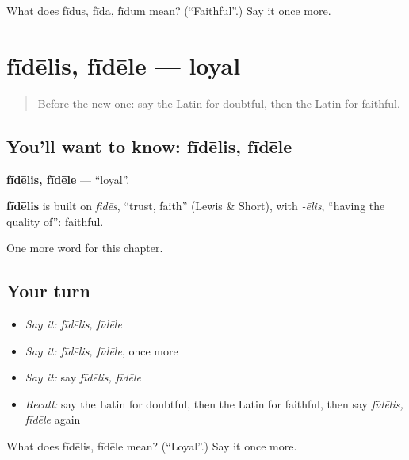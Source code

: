 \begin{tcolorbox}[breakable,colback=teal!4,colframe=teal!35!black,title={Before you move on}]
What does fīdus, fīda, fīdum mean? (\textquotedblleft{}Faithful\textquotedblright{}.) Say it once more.
\end{tcolorbox}
\section[fīdēlis, fīdēle]{fīdēlis, fīdēle — loyal}

\label{lesson:LA-C243-fidelis}



\begin{quote}
Before the new one: say the Latin for doubtful, then the Latin for faithful.
\end{quote}

\subsection*{You'll want to know: fīdēlis, fīdēle}
\textbf{fīdēlis, fīdēle} — \textquotedblleft{}loyal\textquotedblright{}.

\begin{cousinweb}
\textbf{fīdēlis} is built on \emph{fidēs}, \textquotedblleft{}trust, faith\textquotedblright{} (Lewis \& Short), with \emph{-ēlis}, \textquotedblleft{}having the quality of\textquotedblright{}: faithful.
\end{cousinweb}

\begin{grammarlens}[title={What you've built}]
One more word for this chapter.
\end{grammarlens}

\subsection*{Your turn}
\begin{itemize}
\raggedright
  \item \emph{Say it:} \emph{fīdēlis, fīdēle}
  \item \emph{Say it:} \emph{fīdēlis, fīdēle}, once more
  \item \emph{Say it:} say \emph{fīdēlis, fīdēle}
  \item \emph{Recall:} say the Latin for doubtful, then the Latin for faithful, then say \emph{fīdēlis, fīdēle} again
\end{itemize}

\begin{tcolorbox}[breakable,colback=teal!4,colframe=teal!35!black,title={Before you move on}]
What does fīdēlis, fīdēle mean? (\textquotedblleft{}Loyal\textquotedblright{}.) Say it once more.
\end{tcolorbox}
